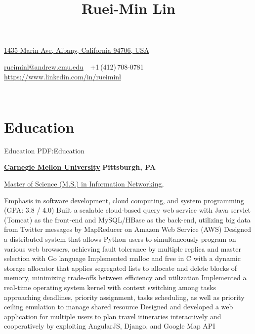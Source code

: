 \documentclass[a4paper,10pt,oneside]{article}
\begin{document}

\title{Ruei-Min Lin}

\begin{subtitle}
\href{https://www.google.com/maps/place/1435+Marin+Ave,+Albany,+CA+94706}
{1435 Marin Ave, Albany, California 94706, USA}
\par
\href{mailto:rueiminl@andrew.cmu.edu}
{rueiminl@andrew.cmu.edu}
\,\BulletSymbol\,
+1\,(412)\,708-0781
\,\BulletSymbol\,
\href{https://www.linkedin.com/in/rueiminl}
{https://www.linkedin.com/in/rueiminl}
\end{subtitle}

\begin{body}

\\[-2.5em]

\section{Education}
{Education}
{PDF:Education}

\href{http://www.cmu.edu/}
{\textbf{Carnegie Mellon University}}
\hfill
\textbf{Pittsburgh, PA}


\SmallEntryGap
\href{http://www.ini.cmu.edu/degrees/msin/index.html}
{Master of Science (M.S.) in Information Networking},

\begin{detail}

\BulletItem
Emphasis in software development, cloud computing, and system programming (GPA: 3.8 / 4.0)
\BulletItem
Built a scalable cloud-based query web service with Java servlet (Tomcat) as the front-end and MySQL/HBase as the back-end, utilizing big data from Twitter messages by MapReducer on Amazon Web Service (AWS)
\BulletItem
Designed a distributed system that allows Python users to simultaneously program on various web browsers, achieving fault tolerance by multiple replica and master selection with Go language
\BulletItem
Implemented malloc and free in C with a dynamic storage allocator that applies segregated lists to allocate and delete blocks of memory, minimizing trade-offs between efficiency and utilization
\BulletItem
Implemented a real-time operating system kernel with context switching among tasks approaching deadlines, priority assignment, tasks scheduling, as well as priority ceiling emulation to manage shared resource
\BulletItem
Designed and developed a web application for multiple users to plan travel itineraries interactively and cooperatively by exploiting AngularJS, Django, and Google Map API
\end{detail}



\end{body}
\end{document}
